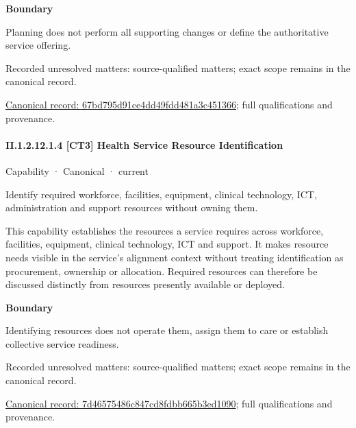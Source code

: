 \textbf{Boundary}



Planning does not perform all supporting changes or define the authoritative service offering.


{\small Recorded unresolved matters: source-qualified matters; exact scope remains in the canonical record.}\par
{\footnotesize \href{../../../../continuum/strategy/capability/67bd795d91ce4dd49fdd481a3c451366.md}{Canonical record: 67bd795d91ce4dd49fdd481a3c451366}; full qualifications and provenance.}\par
\paragraph*{II.1.2.12.1.4 [CT3] Health Service Resource Identification}
\label{navigation:II.1.2.12.1.4}

\label{element:7d46575486c847cd8fdbb665b3ed1090}
{\small Capability · Canonical · current}\par

Identify required workforce, facilities, equipment, clinical technology, ICT, administration and support resources without owning them.



This capability establishes the resources a service requires across workforce, facilities, equipment, clinical technology, ICT and support. It makes resource needs visible in the service's alignment context without treating identification as procurement, ownership or allocation. Required resources can therefore be discussed distinctly from resources presently available or deployed.



\textbf{Boundary}



Identifying resources does not operate them, assign them to care or establish collective service readiness.


{\small Recorded unresolved matters: source-qualified matters; exact scope remains in the canonical record.}\par
{\footnotesize \href{../../../../continuum/strategy/capability/7d46575486c847cd8fdbb665b3ed1090.md}{Canonical record: 7d46575486c847cd8fdbb665b3ed1090}; full qualifications and provenance.}\par
